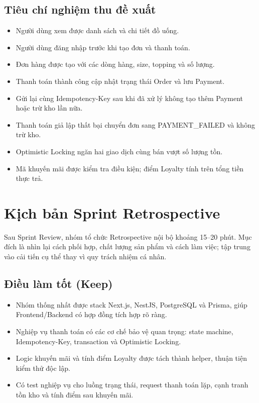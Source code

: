 \subsection{Tiêu chí nghiệm thu đề xuất}

\begin{itemize}
    \item Người dùng xem được danh sách và chi tiết đồ uống.
    \item Người dùng đăng nhập trước khi tạo đơn và thanh toán.
    \item Đơn hàng được tạo với các dòng hàng, size, topping và số lượng.
    \item Thanh toán thành công cập nhật trạng thái Order và lưu Payment.
    \item Gửi lại cùng Idempotency-Key sau khi đã xử lý không tạo thêm Payment hoặc trừ kho lần nữa.
    \item Thanh toán giả lập thất bại chuyển đơn sang PAYMENT\_FAILED và không trừ kho.
    \item Optimistic Locking ngăn hai giao dịch cùng bán vượt số lượng tồn.
    \item Mã khuyến mãi được kiểm tra điều kiện; điểm Loyalty tính trên tổng tiền thực trả.
\end{itemize}

\section{Kịch bản Sprint Retrospective}
\label{sec:sprint-retrospective}

Sau Sprint Review, nhóm tổ chức Retrospective nội bộ khoảng 15--20 phút. Mục đích là nhìn lại cách phối hợp, chất lượng sản phẩm và cách làm việc; tập trung vào cải tiến cụ thể thay vì quy trách nhiệm cá nhân.

\subsection{Điều làm tốt (Keep)}

\begin{itemize}
    \item Nhóm thống nhất được stack Next.js, NestJS, PostgreSQL và Prisma, giúp Frontend/Backend có hợp đồng tích hợp rõ ràng.
    \item Nghiệp vụ thanh toán có các cơ chế bảo vệ quan trọng: state machine, Idempotency-Key, transaction và Optimistic Locking.
    \item Logic khuyến mãi và tính điểm Loyalty được tách thành helper, thuận tiện kiểm thử độc lập.
    \item Có test nghiệp vụ cho luồng trạng thái, request thanh toán lặp, cạnh tranh tồn kho và tính điểm sau khuyến mãi.
\end{itemize}

